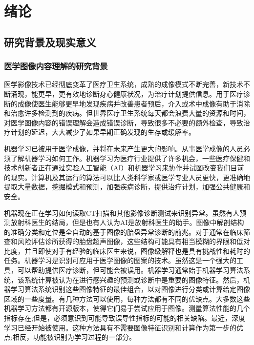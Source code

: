 
\chapter{绪论}
\label{chap:introduction}

\section{研究背景及现实意义}
\subsection{医学图像内容理解的研究背景}

医学影像技术已经彻底变革了医疗卫生系统，成熟的成像模式不断完善，新技术不断涌现，能更早，更有效地诊断身心健康状况，为治疗计划提供信息。用于医疗诊断的成像使医生能够更早地发现疾病并改善患者预后，介入或术中成像有助于消除和治愈许多检测到的疾病。但世界医疗卫生系统每天都会浪费大量的资源和时间，对医学图像内容的错误理解会造成错误诊断，导致很多不必要的额外检查，导致治疗计划的延迟，大大减少了如果早期正确发现的生存或缓解率。

机器学习已被用于医学成像，并将在未来产生更大的影响。从事医学成像的人员必须了解机器学习如何工作。机器学习为医疗行业提供了许多机会，一些医疗保健和技术创新者正在通过实验人工智能（AI）和机器学习来协作并试图改变我们目前的现实。计算机及其运行的算法可以比人类科学家或医学专业人员更快，更准确地提取大量数据，挖掘模式和预测，加强疾病诊断，提供治疗计划，加强公共健康和安全。

机器现在正在学习如何读取CT扫描和其他影像诊断测试来识别异常。虽然有人预测放射科医生的结局，但是也有人认为AI是放射科医生的助手。图像中解剖结构的准确分类和定位是全自动的基于图像的胎盘异常诊断的前兆。对于通常在临床筛查和风险评估诊所获得的胎盘超声图像，这些结构可能具有相当模糊的界限和低对比度，并且即使对于有经验的临床医生来说，图像级解释也是具有挑战性和耗时的任务。机器学习是识别可应用于医学图像的图案的技术。虽然这是一个强大的工具，可以帮助提供医疗诊断，但可能会被误用。机器学习通常始于机器学习算法系统，该系统计算被认为在进行感兴趣的预测或诊断中是重要的图像特征。然后，机器学习算法系统识别这些图像特征的最佳组合，以对图像进行分类或计算给定图像区域的一些度量。有几种方法可以使用，每种方法都有不同的优缺点。大多数这些机器学习方法都有开源版本，使得它们易于尝试应用于图像。测量算法性能的几个指标存在;但是，必须意识到可能导致误导性指标的可能的相关缺陷。最近，深度学习已经开始被使用。这种方法具有不需要图像特征识别和计算作为第一步的优点;相反，功能被识别为学习过程的一部分。

